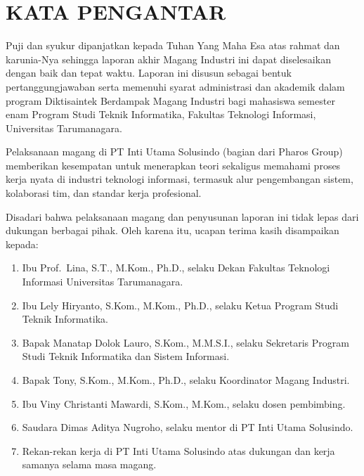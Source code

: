 \chapter*{KATA PENGANTAR} 
\begin{singlespace}
      Puji dan syukur dipanjatkan kepada Tuhan Yang Maha Esa atas rahmat
      dan karunia-Nya sehingga laporan akhir Magang Industri ini dapat
      diselesaikan dengan baik dan tepat waktu. Laporan ini disusun sebagai bentuk
      pertanggungjawaban serta memenuhi syarat administrasi dan akademik dalam
      program Diktisaintek Berdampak Magang Industri bagi mahasiswa semester enam Program Studi
      Teknik Informatika, Fakultas Teknologi Informasi, Universitas Tarumanagara.

      Pelaksanaan magang di PT Inti Utama Solusindo (bagian dari Pharos Group)
      memberikan kesempatan untuk menerapkan teori sekaligus memahami proses kerja
      nyata di industri teknologi informasi, termasuk alur pengembangan sistem,
      kolaborasi tim, dan standar kerja profesional.

      Disadari bahwa pelaksanaan magang dan penyusunan laporan ini tidak lepas dari
      dukungan berbagai pihak. Oleh karena itu, ucapan terima kasih disampaikan
      kepada:

      \begin{enumerate}[label=\arabic*., topsep=2pt, itemsep=0pt, leftmargin=2.5em, labelindent=0pt,]
            \item Ibu Prof.\ Lina, S.T., M.Kom., Ph.D., selaku Dekan Fakultas Teknologi Informasi
                  Universitas Tarumanagara.
            \item Ibu Lely Hiryanto, S.Kom., M.Kom., Ph.D., selaku Ketua Program Studi Teknik
                  Informatika.
            \item Bapak Manatap Dolok Lauro, S.Kom., M.M.S.I., selaku Sekretaris Program Studi
                  Teknik Informatika dan Sistem Informasi.
            \item Bapak Tony, S.Kom., M.Kom., Ph.D., selaku Koordinator Magang Industri.
            \item Ibu Viny Christanti Mawardi, S.Kom., M.Kom., selaku dosen pembimbing.
            \item Saudara Dimas Aditya Nugroho, selaku mentor di PT Inti Utama Solusindo.
            \item Rekan-rekan kerja di PT Inti Utama Solusindo atas dukungan dan kerja samanya
                  selama masa magang.
      \end{enumerate}


\end{singlespace}
